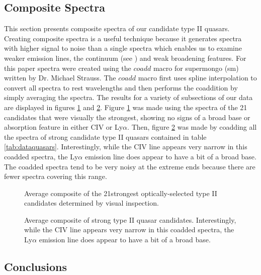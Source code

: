 \documentclass[preprint]{aastex}
\begin{document}
\subsection{Composite Spectra}

This section presents composite spectra of our candidate type II quasars.  Creating composite spectra is a useful technique because it generates spectra with higher signal to noise than a single spectra which enables us to examine weaker emission lines, the continuum (see \cite{hassen}) and weak broadening features.  For this paper spectra were created using the $coadd$ macro for supermongo (sm) written by Dr. Michael Strauss.  The $coadd$ macro first uses spline interpolation to convert all spectra to rest wavelengths and then performs the coaddition by simply averaging the spectra.  The results for a variety of subsections of our data are displayed in figures \ref{fig:coadd_best20} and \ref{fig:coadd_quasars}.  Figure \ref{fig:coadd_best20} was made using the spectra of the 21 candidates that were visually the strongest, showing no signs of a broad base or absorption feature in either CIV or Ly$\alpha$.  Then, figure \ref{fig:coadd_quasars} was made by coadding all the spectra of strong candidate type II quasars contained in table \ref{tab:dataquasars}.  Interestingly, while the CIV line appears very narrow in this coadded spectra, the Ly$\alpha$ emission line does appear to have a bit of a broad base.  The coadded spectra tend to be very noisy at the extreme ends because there are fewer spectra covering this range.      

\begin{figure}
\begin{center}
\end{center}
\caption{Average composite of the 21strongest optically-selected type II candidates determined by visual inspection.}
\label{fig:coadd_best20}
\end{figure}

\begin{figure}
\begin{center}
\end{center}
\caption{Average composite of strong type II quasar candidates.  Interestingly, while the CIV line appears very narrow in this coadded spectra, the Ly$\alpha$ emission line does appear to have a bit of a broad base.}
\label{fig:coadd_quasars}
\end{figure}

\subsection{Conclusions}
\end{document}
